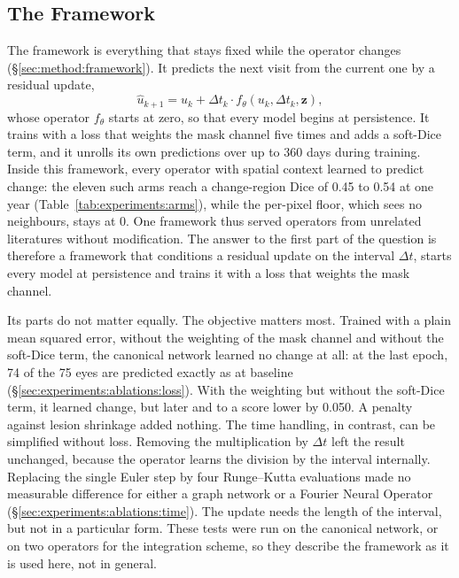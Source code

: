 \subsection{The Framework}
\label{sec:discussion:framework}

The framework is everything that stays fixed while the operator changes
(\S\ref{sec:method:framework}). It predicts the next visit from the
current one by a residual update,
\begin{equation*}
  \hat u_{k+1} = u_k + \Delta t_k \cdot f_\theta(u_k, \Delta t_k, \mathbf{z}),
\end{equation*}
whose operator $f_\theta$ starts at zero, so that every model begins at
persistence. It trains with a loss that weights the mask channel five
times and adds a soft-Dice term, and it unrolls its own predictions over up
to 360 days during training. Inside this framework, every operator with
spatial context learned to predict change: the eleven such arms reach a
change-region Dice of 0.45 to 0.54 at one year
(Table~\ref{tab:experiments:arms}), while the per-pixel floor, which sees
no neighbours, stays at 0. One framework thus served operators from
unrelated literatures without modification. The answer to the first part
of the question is therefore a framework that conditions a residual update
on the interval $\Delta t$, starts every model at persistence and trains it
with a loss that weights the mask channel.

Its parts do not matter equally. The objective matters most. Trained with
a plain mean squared error, without the weighting of the mask channel and
without the soft-Dice term, the canonical network learned no change at
all: at the last epoch, 74 of the 75 eyes are predicted exactly as at
baseline (\S\ref{sec:experiments:ablations:loss}). With the weighting but
without the soft-Dice term, it learned change, but later and to a score
lower by 0.050. A penalty against lesion shrinkage added nothing. The time
handling, in contrast, can be simplified without loss. Removing the
multiplication by $\Delta t$ left the result unchanged, because the
operator learns the division by the interval internally. Replacing the
single Euler step by four Runge--Kutta evaluations made no measurable
difference for either a graph network or a Fourier Neural Operator
(\S\ref{sec:experiments:ablations:time}). The update needs the length of
the interval, but not in a particular form. These tests were run on the
canonical network, or on two operators for the integration scheme, so
they describe the framework as it is used here, not in general.


